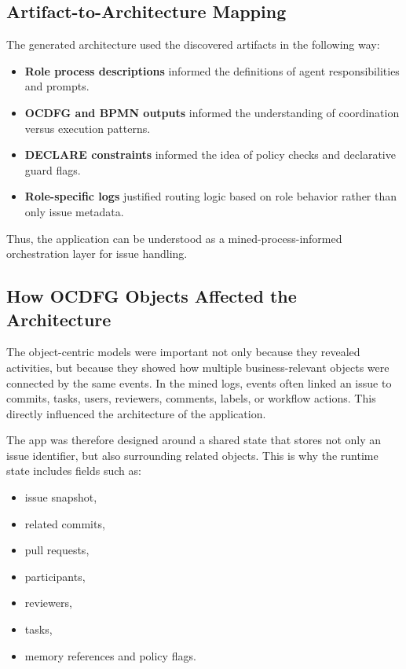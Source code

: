 \documentclass[11pt,a4paper]{article}
\begin{document}
\subsection{Artifact-to-Architecture Mapping}

The generated architecture used the discovered artifacts in the following way:
\begin{itemize}
    \item \textbf{Role process descriptions} informed the definitions of agent responsibilities and prompts.
    \item \textbf{OCDFG and BPMN outputs} informed the understanding of coordination versus execution patterns.
    \item \textbf{DECLARE constraints} informed the idea of policy checks and declarative guard flags.
    \item \textbf{Role-specific logs} justified routing logic based on role behavior rather than only issue metadata.
\end{itemize}

Thus, the application can be understood as a mined-process-informed orchestration layer for issue handling.

\subsection{How OCDFG Objects Affected the Architecture}

The object-centric models were important not only because they revealed activities, but because they showed how multiple business-relevant objects were connected by the same events. In the mined logs, events often linked an issue to commits, tasks, users, reviewers, comments, labels, or workflow actions. This directly influenced the architecture of the application.

The app was therefore designed around a shared state that stores not only an issue identifier, but also surrounding related objects. This is why the runtime state includes fields such as:
\begin{itemize}
    \item issue snapshot,
    \item related commits,
    \item pull requests,
    \item participants,
    \item reviewers,
    \item tasks,
    \item memory references and policy flags.
\end{itemize}
\end{document}
